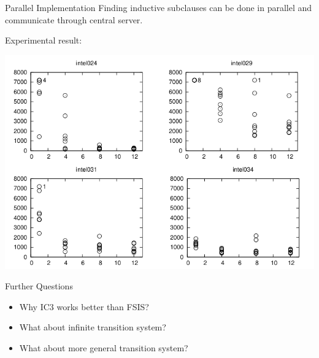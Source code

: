 \documentclass[aspectratio=1610, 13pt]{beamer}
\begin{document}
\begin{frame}{Parallel Implementation}
	Finding inductive subclauses can be done in parallel and communicate through central server.
	
Experimental result:
\begin{center}
\includegraphics[scale=0.28]{para.png}
\end{center}
\end{frame}

\begin{frame}{Further Questions}
\begin{itemize}
\item Why IC3 works better than FSIS?
\item What about infinite transition system?
\item What about more general transition system?
\end{itemize}
\end{frame}
\end{document}
